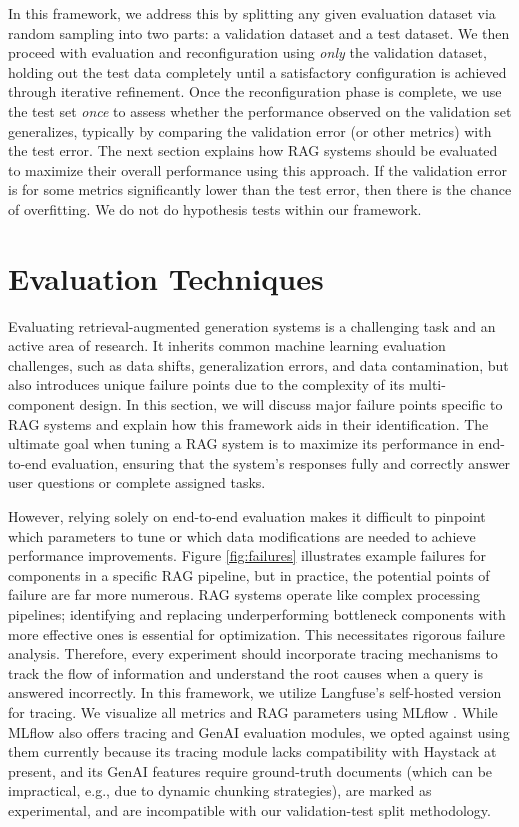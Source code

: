 In this framework, we address this by splitting any given evaluation dataset via random sampling into two parts: a validation dataset and a test dataset. We then proceed with evaluation and reconfiguration using \textit{only} the validation dataset, holding out the test data completely until a satisfactory configuration is achieved through iterative refinement. Once the reconfiguration phase is complete, we use the test set \textit{once} to assess whether the performance observed on the validation set generalizes, typically by comparing the validation error (or other metrics) with the test error. The next section explains how RAG systems should be evaluated to maximize their overall performance using this approach. If the validation error is for some metrics significantly lower than the test error, then there is the chance of overfitting. We do not do hypothesis tests within our framework.

\section{Evaluation Techniques}

Evaluating retrieval-augmented generation systems is a challenging task and an active area of research. It inherits common machine learning evaluation challenges, such as data shifts, generalization errors, and data contamination, but also introduces unique failure points due to the complexity of its multi-component design. In this section, we will discuss major failure points specific to RAG systems and explain how this framework aids in their identification. The ultimate goal when tuning a RAG system is to maximize its performance in end-to-end evaluation, ensuring that the system's responses fully and correctly answer user questions or complete assigned tasks.

However, relying solely on end-to-end evaluation makes it difficult to pinpoint which parameters to tune or which data modifications are needed to achieve performance improvements. Figure \ref{fig:failures} illustrates example failures for components in a specific RAG pipeline, but in practice, the potential points of failure are far more numerous. RAG systems operate like complex processing pipelines; identifying and replacing underperforming bottleneck components with more effective ones is essential for optimization. This necessitates rigorous failure analysis. Therefore, every experiment should incorporate tracing mechanisms to track the flow of information and understand the root causes when a query is answered incorrectly. In this framework, we utilize Langfuse's \cite{Langfuse} self-hosted version for tracing. We visualize all metrics and RAG parameters using MLflow \cite{MLflow}. While MLflow also offers tracing and GenAI evaluation modules, we opted against using them currently because its tracing module lacks compatibility with Haystack at present, and its GenAI features require ground-truth documents (which can be impractical, e.g., due to dynamic chunking strategies), are marked as experimental, and are incompatible with our validation-test split methodology.

